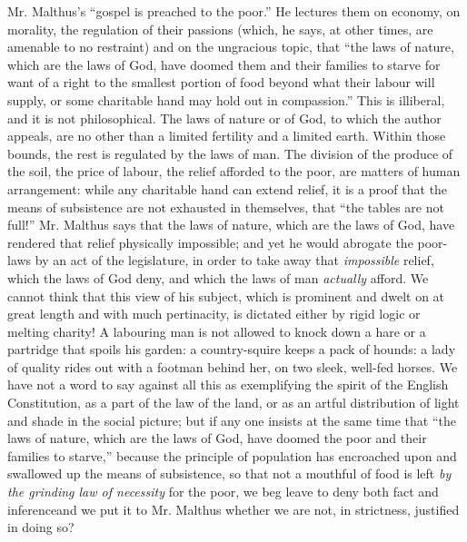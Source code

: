 Mr. Malthus's ``gospel is preached to the poor.'' He lectures them
on economy, on morality, the regulation of their passions (which,
he says, at other times, are amenable to no restraint) and on the
ungracious topic, that ``the laws of nature, which are the laws of
God, have doomed them and their families to starve for want of a
right to the smallest portion of food beyond what their labour
will supply, or some charitable hand may hold out in compassion.''
This is illiberal, and it is not philosophical. The laws of nature
or of God, to which the author appeals, are no other than a
limited fertility and a limited earth.  Within those bounds, the
rest is regulated by the laws of man. The division of the produce
of the soil, the price of labour, the relief afforded to the poor,
are matters of human arrangement: while any charitable hand can
extend relief, it is a proof that the means of subsistence are not
exhausted in themselves, that ``the tables are not full!''
Mr. Malthus says that the laws of nature, which are the laws of
God, have rendered that relief physically impossible; and yet he
would abrogate the poor-laws by an act of the legislature, in
order to take away that \emph{impossible} relief, which the laws
of God deny, and which the laws of man \emph{actually} afford. We
cannot think that this view of his subject, which is prominent and
dwelt on at great length and with much pertinacity, is dictated
either by rigid logic or melting charity! A labouring man is not
allowed to knock down a hare or a partridge that spoils his
garden: a country-squire keeps a pack of hounds: a lady of quality
rides out with a footman behind her, on two sleek, well-fed
horses. We have not a word to say against all this as exemplifying
the spirit of the English Constitution, as a part of the law of
the land, or as an artful distribution of light and shade in the
social picture; but if any one insists at the same time that ``the
laws of nature, which are the laws of God, have doomed the poor
and their families to starve,'' because the principle of
population has encroached upon and swallowed up the means of
subsistence, so that not a mouthful of food is left \emph{by the
grinding law of necessity} for the poor, we beg leave to deny both
fact and inference\textemdash and we put it to Mr. Malthus whether
we are not, in strictness, justified in doing so?

